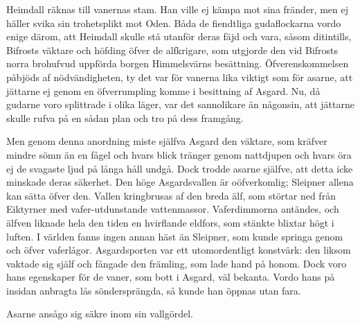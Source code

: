 Heimdall räknas till vanernas stam. Han ville ej kämpa mot sina fränder,
men ej häller svika sin trohetsplikt mot Oden. Båda de fiendtliga
gudaflockarna vordo enige därom, att Heimdall skulle stå utanför deras
fäjd och vara, såsom ditintills, Bifrosts väktare och höfding öfver de
alfkrigare, som utgjorde den vid Bifrosts norra brohufvud uppförda
borgen Himmelsvärns besättning. Öfverenskommelsen påbjöds af
nödvändigheten, ty det var för vanerna lika viktigt som för asarne, att
jättarne ej genom en öfverrumpling komme i besittning af Asgard. Nu, då
gudarne voro splittrade i olika läger, var det sannolikare än någonsin,
att jättarne skulle rufva på en sådan plan och tro på dess framgång.

Men genom denna anordning miste själfva Asgard den väktare, som kräfver
mindre sömn än en fågel och hvars blick tränger genom nattdjupen och
hvars öra ej de svagaste ljud på långa håll undgå. Dock trodde asarne
själfve, att detta icke minskade deras säkerhet. Den höge Asgardsvallen
är oöfverkomlig; Sleipner allena kan sätta öfver den. Vallen kringbrusas
af den breda älf, som störtar ned från Eiktyrner med vafer-utdunstande
vattenmassor. Vaferdimmorna antändes, och älfven liknade hela den tiden
en hvirflande eldfors, som stänkte blixtar högt i luften. I världen
fanns ingen annan häst än Sleipner, som kunde springa genom och öfver
vaferlågor. Asgardsporten var ett utomordentligt konstvärk: den liksom
vaktade sig själf och fångade den främling, som lade hand på honom. Dock
voro hans egenskaper för de vaner, som bott i Asgard, väl bekanta. Vordo
hans på insidan anbragta lås söndersprängda, så kunde han öppnas utan
fara.

Asarne ansågo sig säkre inom sin vallgördel.

